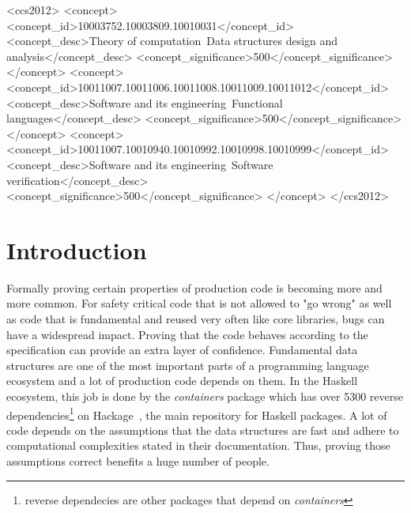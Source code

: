 \documentclass[sigplan,screen,review,anonymous]{acmart}
\begin{document}
\begin{CCSXML}
<ccs2012>
   <concept>
       <concept_id>10003752.10003809.10010031</concept_id>
       <concept_desc>Theory of computation~Data structures design and analysis</concept_desc>
       <concept_significance>500</concept_significance>
       </concept>
   <concept>
       <concept_id>10011007.10011006.10011008.10011009.10011012</concept_id>
       <concept_desc>Software and its engineering~Functional languages</concept_desc>
       <concept_significance>500</concept_significance>
       </concept>
   <concept>
       <concept_id>10011007.10010940.10010992.10010998.10010999</concept_id>
       <concept_desc>Software and its engineering~Software verification</concept_desc>
       <concept_significance>500</concept_significance>
       </concept>
 </ccs2012>
\end{CCSXML}



\maketitle

\section{Introduction}

Formally proving certain properties of production code is becoming more and more common. For safety critical code that is not allowed to "go wrong" as well as code that is fundamental and reused very often like core libraries, bugs can have a widespread impact. Proving that the code behaves according to the specification can provide an extra layer of confidence. Fundamental data structures are one of the most important parts of a programming language ecosystem and a lot of production code depends on them. In the Haskell ecosystem, this job is done by the \textit{containers} package which has over 5300 reverse dependencies\footnote{reverse dependecies are other packages that depend on \textit{containers}} on Hackage~\cite{hackage}, the main repository for Haskell packages. A lot of code depends on the assumptions that the data structures are fast and adhere to computational complexities stated in their documentation. Thus, proving those assumptions correct benefits a huge number of people.
\end{document}
